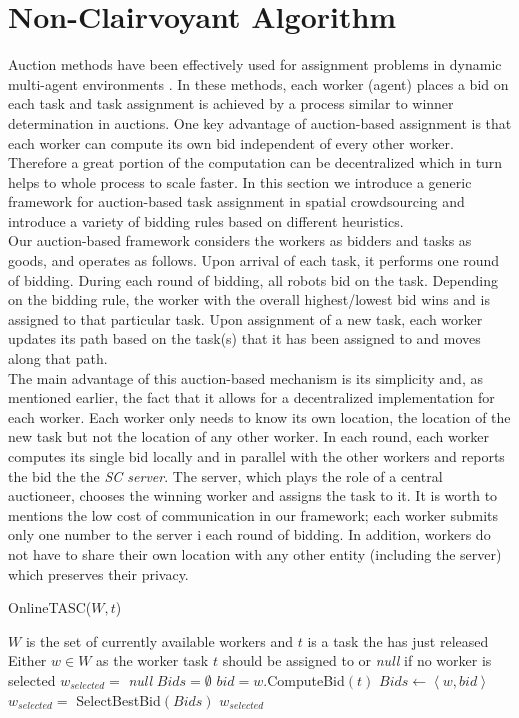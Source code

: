 \section{Non-Clairvoyant Algorithm}

Auction methods have been effectively used for assignment problems in dynamic multi-agent environments \cite{Mehta05,Lagoudakis04}. In these methods, each worker (agent) places a bid on each task and task assignment is achieved by a process similar to winner determination in auctions. One key advantage of auction-based assignment is that each worker can compute its own bid independent of every other worker. Therefore a great portion of the computation can be decentralized which in turn helps to whole process to scale faster. In this section we introduce a generic framework for auction-based task assignment in spatial crowdsourcing and introduce a variety of bidding rules based on different heuristics.\\

Our auction-based framework considers the workers as bidders and tasks as goods, and operates as follows. Upon arrival of each task, it performs one round of bidding. During each round of bidding, all robots bid on the task. Depending on the bidding rule, the worker with the overall highest/lowest bid wins and is assigned to that particular task. Upon assignment of a new task, each worker updates its path based on the task(s) that it has been assigned to and moves along that path.\\

The main advantage of this auction-based mechanism is its simplicity and, as mentioned earlier, the fact that it allows for a decentralized implementation for each worker. Each worker only needs to know its own location, the location of the new task but not the location of any other worker. In each round, each worker computes its single bid locally and in parallel with the other workers and reports the bid the the \textit{SC server}. The server, which plays the role of a central auctioneer, chooses the winning worker and assigns the task to it. It is worth to mentions the low cost of communication in our framework; each worker submits only one number to the server i each round of bidding. In addition, workers do not have to share their own location with any other entity (including the server) which preserves their privacy.\\

\begin{algorithm}
\caption{OnlineTASC($W, t$)}
\label{algo:OnlineTASC}
\begin{algorithmic}[1]
\REQUIRE $W$ is the set of currently available workers and $t$ is a task the has just released
\ENSURE Either $w \in W$ as the worker task $t$ should be assigned to or \emph{null} if no worker is selected
\STATE $w_{selected} = $ \emph{null}
\STATE $Bids = \emptyset$
	\STATE $bid = w$.ComputeBid$(t)$
	\STATE $Bids \leftarrow \left\langle w, bid \right\rangle$
\ENDFOR
\STATE $w_{selected} = $ SelectBestBid$(Bids)$
\RETURN $w_{selected}$
\end{algorithmic}
\end{algorithm}


